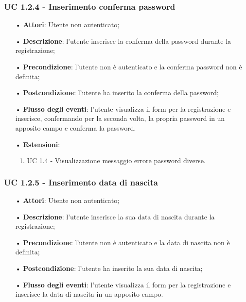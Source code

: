 \subsubsection{UC 1.2.4 - Inserimento conferma password}
\begin{itemize}
	\item[•]\textbf{Attori}: Utente non autenticato;
	\item[•]\textbf{Descrizione}: l'utente inserisce la conferma della password durante la registrazione;
	\item[•]\textbf{Precondizione}: l'utente non è autenticato e la conferma password non è definita;
	\item[•]\textbf{Postcondizione}: l'utente ha inserito la conferma della password;
	\item[•]\textbf{Flusso degli eventi}: l'utente visualizza il form per la registrazione e inserisce, confermando per la seconda volta, la propria password in un apposito campo e conferma la password.
	\item[•] \textbf{Estensioni}:
		\begin{enumerate}
		\item UC 1.4 - Visualizzazione messaggio errore password diverse.
	\end{enumerate}
\end{itemize}

\subsubsection{UC 1.2.5 - Inserimento data di nascita}
\begin{itemize}
	\item[•]\textbf{Attori}: Utente non autenticato;
	\item[•]\textbf{Descrizione}: l'utente inserisce la sua data di nascita durante la registrazione;
	\item[•]\textbf{Precondizione}: l'utente non è autenticato e la data di nascita non è definita;
	\item[•]\textbf{Postcondizione}: l'utente ha inserito la sua data di nascita;
	\item[•]\textbf{Flusso degli eventi}: l'utente visualizza il form per la registrazione e inserisce la data di nascita in un apposito campo.
\end{itemize}

